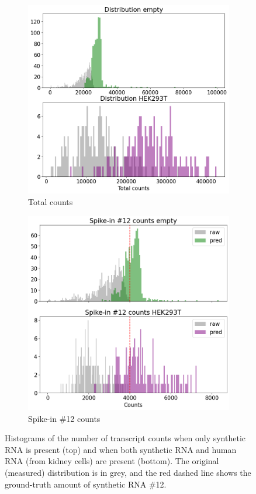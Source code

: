 \documentclass{article}
\theoremstyle{plain}
\theoremstyle{definition}
\theoremstyle{remark}
\begin{document}
\begin{figure}[h!]
     \centering
     \begin{subfigure}{\columnwidth}
         \centering
         \includegraphics[width=0.85\columnwidth]{spike_totals.png}
         \caption{Total counts}
         \label{fig:spike_totals}
     \end{subfigure}
     \vfill
     \begin{subfigure}{\columnwidth}
         \centering
         \includegraphics[width=0.85\columnwidth]{spike12_counts.png}
         \caption{Spike-in \#12 counts}
         \label{fig:spike12_totals}
     \end{subfigure}
     \caption{Histograms of the number of transcript counts when only synthetic RNA is present (top) and when both synthetic RNA and human RNA (from kidney cells) are present (bottom). The original (measured) distribution is in grey, and the red dashed line shows the ground-truth amount of synthetic RNA \#12.}
     \label{fig:spike_estimates}
\end{figure}
\end{document}
